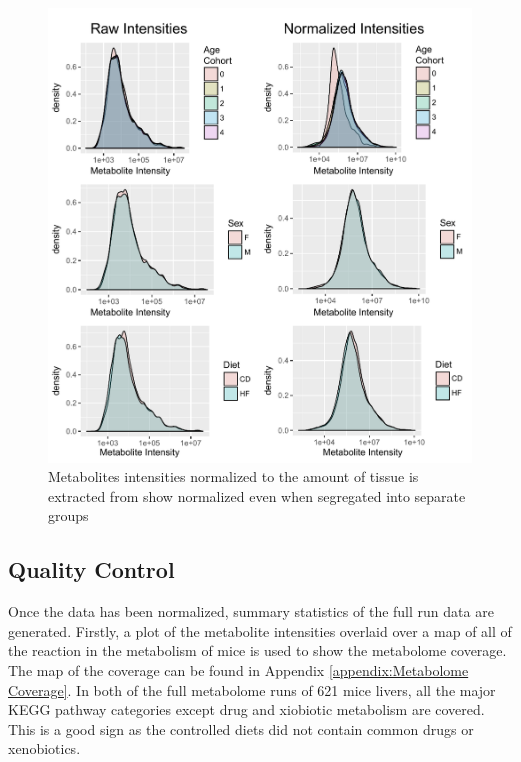 \documentclass[a4paper,11pt,twoside]{book}
\begin{document}
	\begin{figure}[ht!b]
		\centering
		\includegraphics[width=\linewidth]{3.Metabolomics/Factor_Densities_Final.pdf}
		\caption{Metabolites intensities normalized to the amount of tissue is extracted from show normalized even when segregated into separate groups}
		\label{fig: Meatbolite Data Normalization}
	\end{figure}
	
	\subsection{Quality Control}
	
	Once the data has been normalized, summary statistics of the full run data are generated. Firstly, a plot of the metabolite intensities overlaid over a map of all of the reaction in the metabolism of mice is used to show the metabolome coverage. The map of the coverage can be found in Appendix \ref{appendix:Metabolome Coverage}. In both of the full metabolome runs of 621 mice livers, all the major KEGG pathway categories except drug and xiobiotic metabolism are covered. This is a good sign as the controlled diets did not contain common drugs or xenobiotics. 
	
\end{document}
